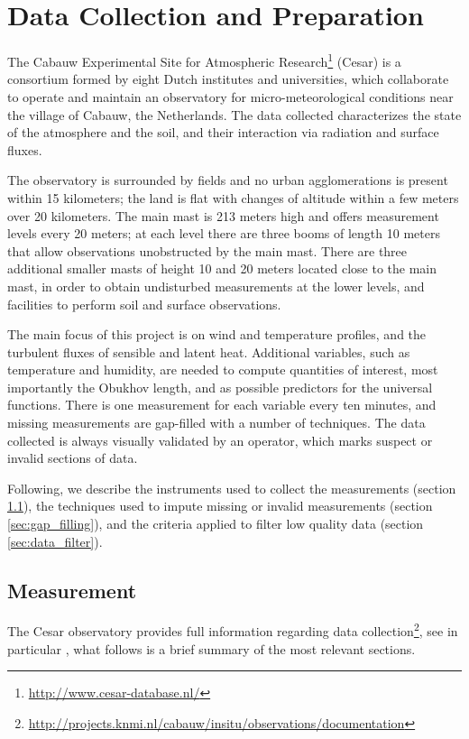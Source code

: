 \documentclass[a4paper]{book}
\begin{document}
\section{Data Collection and Preparation}
\label{sec:data_collection}
The Cabauw Experimental Site for Atmospheric Research\footnote{\url{http://www.cesar-database.nl/}} (Cesar) is a consortium formed by eight Dutch institutes and universities, which collaborate to operate and maintain an observatory for micro-meteorological conditions near the village of Cabauw, the Netherlands. The data collected characterizes the state of the atmosphere and the soil, and their interaction via radiation and surface fluxes.

The observatory is surrounded by fields and no urban agglomerations is present within 15 kilometers; the land is flat with changes of altitude within a few meters over 20 kilometers. The main mast is 213 meters high and offers measurement levels every 20 meters; at each level there are three booms of length 10 meters that allow observations unobstructed by the main mast. There are three additional smaller masts of height 10 and 20 meters located close to the main mast, in order to obtain undisturbed measurements at the lower levels, and facilities to perform soil and surface observations.

The main focus of this project is on wind and temperature profiles, and the turbulent fluxes of sensible and latent heat. Additional variables, such as temperature and humidity, are needed to compute quantities of interest, most importantly the Obukhov length, and as possible predictors for the universal functions. There is one measurement for each variable every ten minutes, and missing measurements are gap-filled with a number of techniques. The data collected is always visually validated by an operator, which marks suspect or invalid sections of data.

Following, we describe the instruments used to collect the measurements (section \ref{sec:measurement}), the techniques used to impute missing or invalid measurements (section \ref{sec:gap_filling}), and the criteria applied to filter low quality data (section \ref{sec:data_filter}).

\subsection{Measurement}
\label{sec:measurement}
The Cesar observatory provides full information regarding data collection\footnote{\url{http://projects.knmi.nl/cabauw/insitu/observations/documentation}}, see in particular \cite{cabauwinsitu}, what follows is a brief summary of the most relevant sections.
\end{document}
